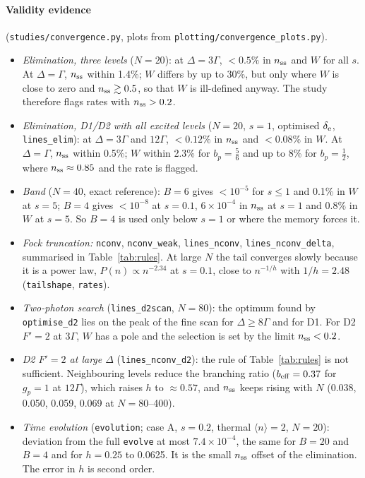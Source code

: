 \documentclass[11pt,a4paper]{article}
\newcommand{\code}[1]{\texttt{#1}}
\begin{document}
\paragraph{Validity evidence} (\code{studies/convergence.py}, plots from \code{plotting/convergence\_plots.py}).
\begin{itemize}
\item \emph{Elimination, three levels} ($N=20$): at $\Delta=3\Gamma$, $<0.5\%$ in $n_{\rm ss}$ and $W$ for all $s$. At $\Delta=\Gamma$, $n_{\rm ss}$ within 1.4\%; $W$ differs by up to 30\%, but only where $W$ is close to zero and $n_{\rm ss}\gtrsim0.5$, so that $W$ is ill-defined anyway. The study therefore flags rates with $n_{\rm ss}>0.2$.
\item \emph{Elimination, D1/D2 with all excited levels} ($N=20$, $s=1$, optimised $\delta_{\rm e}$, \code{lines\_elim}): at $\Delta=3\Gamma$ and $12\Gamma$, $<0.12\%$ in $n_{\rm ss}$ and $<0.08\%$ in $W$. At $\Delta=\Gamma$, $n_{\rm ss}$ within 0.5\%; $W$ within 2.3\% for $b_p=\tfrac56$ and up to 8\% for $b_p=\tfrac12$, where $n_{\rm ss}\approx0.85$ and the rate is flagged.
\item \emph{Band} ($N=40$, exact reference): $B=6$ gives $<10^{-5}$ for $s\le1$ and 0.1\% in $W$ at $s=5$; $B=4$ gives $<10^{-8}$ at $s=0.1$, $6\times10^{-4}$ in $n_{\rm ss}$ at $s=1$ and 0.8\% in $W$ at $s=5$. So $B=4$ is used only below $s=1$ or where the memory forces it.
\item \emph{Fock truncation:} \code{nconv}, \code{nconv\_weak}, \code{lines\_nconv}, \code{lines\_nconv\_delta}, summarised in Table~\ref{tab:rules}. At large $N$ the tail converges slowly because it is a power law, $P(n)\propto n^{-2.34}$ at $s=0.1$, close to $n^{-1/h}$ with $1/h=2.48$ (\code{tailshape}, \code{rates}).
\item \emph{Two-photon search} (\code{lines\_d2scan}, $N=80$): the optimum found by \code{optimise\_d2} lies on the peak of the fine scan for $\Delta\ge8\Gamma$ and for D1. For D2 $F'=2$ at $3\Gamma$, $W$ has a pole and the selection is set by the limit $n_{\rm ss}<0.2$.
\item \emph{D2 $F'=2$ at large $\Delta$} (\code{lines\_nconv\_d2}): the rule of Table~\ref{tab:rules} is not sufficient. Neighbouring levels reduce the branching ratio ($b_{\rm eff}=0.37$ for $g_p=1$ at $12\Gamma$), which raises $h$ to $\approx0.57$, and $n_{\rm ss}$ keeps rising with $N$ (0.038, 0.050, 0.059, 0.069 at $N=80$--400).
\item \emph{Time evolution} (\code{evolution}; case A, $s=0.2$, thermal $\langle n\rangle=2$, $N=20$): deviation from the full \code{evolve} at most $7.4\times10^{-4}$, the same for $B=20$ and $B=4$ and for $h=0.25$ to 0.0625. It is the small $n_{\rm ss}$ offset of the elimination. The error in $h$ is second order.
\end{itemize}
\end{document}
